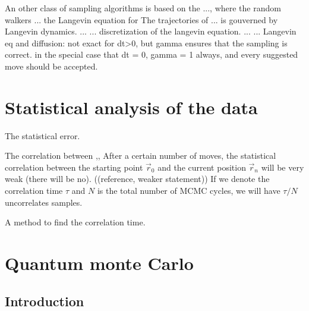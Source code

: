 \documentclass[a4paper,10pt,twocolumn]{article} %
\begin{document}
An other class of sampling algorithms is based on the ..., where the random walkers ... the Langevin equation for 
The trajectories of ... is gouverned by Langevin dynamics. 
...
...
discretization of the langevin equation.
...
...
Langevin eq and diffusion: not exact for dt>0, but gamma ensures that the sampling is correct. in the special case that 
dt = 0, gamma = 1 always, and every suggested move should be accepted. 


\section{Statistical analysis of the data}%

The statistical error.

The correlation between ,,
After a certain number of moves, the statistical correlation between
the starting point $\vec r_0$ and the current position $\vec r_n$ will be very weak (there will be no). 
((reference, weaker statement))
If we denote the correlation time $\tau$ and $N$ is the total number of MCMC cycles, 
we will have $\tau/N$ uncorrelates samples. 

A method to find the correlation time.

\section{Quantum monte Carlo}%

\subsection{Introduction}%
\end{document}

